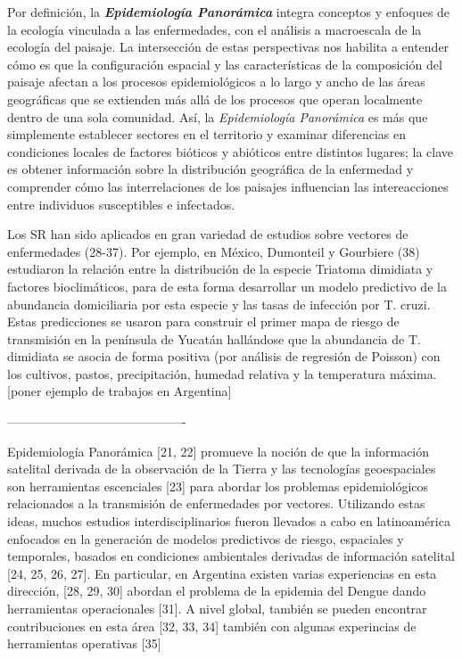 \par Por definición, la \textbf{\textit{Epidemiología Panorámica}} integra conceptos y
  enfoques de la ecología vinculada a las enfermedades, con el análisis a
  macroescala de la ecología del paisaje. La intersección de estas perspectivas
  nos habilita a entender cómo es que la configuración espacial y las
  características de la composición del paisaje afectan a los procesos
  epidemiológicos a lo largo y ancho de las áreas geográficas que se
  extienden más allá de los procesos que operan localmente dentro de una sola comunidad.
  Así, la \textit{Epidemiología Panorámica} es más que simplemente establecer
  sectores en el territorio y examinar diferencias en condiciones locales de
  factores bióticos y abióticos entre distintos lugares; la clave es obtener
  información sobre la distribución geográfica de la enfermedad y comprender
  cómo las interrelaciones de los paisajes influencian las intereacciones entre
  individuos susceptibles e infectados.

Los SR han sido aplicados en gran variedad de estudios sobre vectores de
enfermedades (28-37). Por ejemplo, en México, Dumonteil y Gourbiere (38)
estudiaron la relación entre la distribución de la especie Triatoma dimidiata
y factores bioclimáticos, para de esta forma desarrollar un modelo predictivo de
la abundancia domiciliaria por esta especie y las tasas de infección
por T. cruzi. Estas predicciones se usaron para construir el primer mapa de
riesgo de transmisión en la península de Yucatán hallándose que la abundancia de T.
dimidiata se asocia de forma positiva (por análisis de regresión de Poisson)
con los cultivos, pastos, precipitación, humedad relativa y la temperatura
máxima. [poner ejemplo de trabajos en Argentina]

-------------------------------------------

Epidemiología Panorámica [21, 22] promueve la noción de que la información
satelital derivada de la observación de la Tierra y las tecnologías geoespaciales
son herramientas escenciales [23] para abordar los problemas epidemiológicos
relacionados a la transmisión de enfermedades por vectores. Utilizando
estas ideas, muchos estudios interdisciplinarios fueron llevados a cabo en
latinoamérica enfocados en la generación de modelos predictivos de riesgo,
espaciales y temporales, basados en condiciones ambientales derivadas de
información satelital [24, 25, 26, 27]. En particular, en Argentina
existen varias experiencias en esta dirección, [28, 29, 30] abordan el
problema de la epidemia del Dengue dando herramientas operacionales [31].
A nivel global, también se pueden encontrar contribuciones en esta área
[32, 33, 34] también con algunas experincias de herramientas operativas [35]


